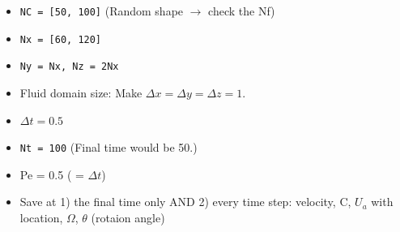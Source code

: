 \begin{framed}
	\begin{itemize}
	\item \verb+NC = [50, 100]+ (Random shape {\color{red}$\rightarrow$ check the Nf}) 
	\item \verb+Nx = [60, 120]+
	\item \verb+Ny = Nx, Nz = 2Nx+
	\item Fluid domain size: Make $\Delta x =\Delta y = \Delta z = 1$.
	\item $\Delta t = 0.5$
	\item \verb+Nt = 100+ (Final time would be 50.)
	\item Pe = 0.5 ( = $\Delta t$)
	\item {\color{blue} Save at 1) the final time only AND 2) every time step: velocity, C, $U_a$ with location, $\Omega$, $\theta$ (rotaion angle)}
	\end{itemize}
\end{framed}

